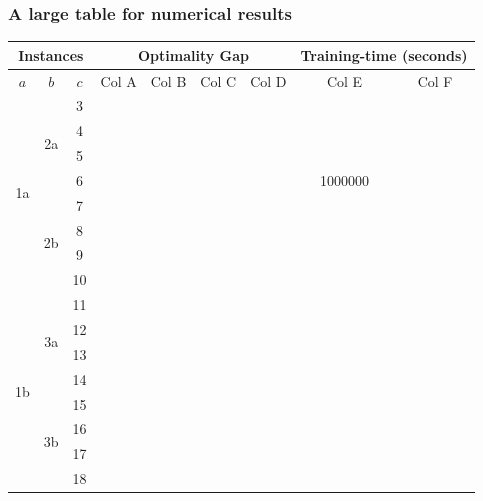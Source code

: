 \documentclass{beamer}
\begin{document}
\begin{frame}
\frametitle{A large table for numerical results}

\begin{tiny}
\begin{table}[]
\begin{tabular}{|c|c|c|c|c|c|c|c|c|}
\hline
\multicolumn{3}{|c|}{Instances}                  & \multicolumn{4}{c|}{Optimality Gap}               & \multicolumn{2}{c|}{Training-time (seconds)} \\ \hline
$a$                & $b$              & $c$ & Col A & Col B & Col C & Col D & Col E          & Col F          \\ \hline 
\multirow{8}{*}{1a} & \multirow{4}{*}{2a} & 3   &    &  & & & &   \\
                      & & 4  &   &  & & & &   \\
                      & & 5  &   &  & & & &   \\
                      & & 6  &   &  & & & 1000000&   \\ \cline{2-9} 
                      & \multirow{4}{*}{2b} & 7   & &   &   &  & &    \\
                      & &  8 &   &  & & & &   \\
                      & &  9 &   &  & & & &   \\
                      & &  10 &   &  & & & &   \\ \hline \hline
\multirow{8}{*}{1b} & \multirow{4}{*}{3a} & 11  & & & && &   \\
                        & & 12  &   &  & & & &   \\
                         & &13   &   &  & & & &   \\
                      & &14   &   &  & & & &   \\ \cline{2-9} 
                      & \multirow{4}{*}{3b} &15   &   &  & & & &   \\
                      & & 16  &   &  & & & &   \\
                      & & 17  &   &  & & & &   \\
                      & & 18  &   &  & & & &   \\ \hline
\end{tabular}
\end{table}
\end{tiny}    
\end{frame}
\end{document}
